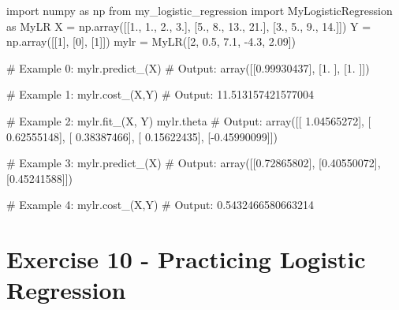 \documentclass[]{article}
\newenvironment{Shaded}{\begin{snugshade}}{\end{snugshade}}
\newcommand{\CommentTok}[1]{\textcolor[rgb]{0.48,0.49,0.49}{#1}}
\newcommand{\DecValTok}[1]{\textcolor[rgb]{0.96,0.45,0.00}{#1}}
\newcommand{\FloatTok}[1]{\textcolor[rgb]{0.96,0.45,0.00}{#1}}
\newcommand{\ImportTok}[1]{\textcolor[rgb]{0.15,0.68,0.38}{#1}}
\newcommand{\NormalTok}[1]{\textcolor[rgb]{0.81,0.81,0.76}{#1}}
\newcommand{\OperatorTok}[1]{\textcolor[rgb]{0.81,0.81,0.76}{#1}}
\begin{document}
\begin{Shaded}
\begin{Highlighting}[]
\ImportTok{import}\NormalTok{ numpy }\ImportTok{as}\NormalTok{ np}
\ImportTok{from}\NormalTok{ my_logistic_regression }\ImportTok{import}\NormalTok{ MyLogisticRegression }\ImportTok{as}\NormalTok{ MyLR}
\NormalTok{X }\OperatorTok{=}\NormalTok{ np.array([[}\FloatTok{1.}\NormalTok{, }\FloatTok{1.}\NormalTok{, }\FloatTok{2.}\NormalTok{, }\FloatTok{3.}\NormalTok{], [}\FloatTok{5.}\NormalTok{, }\FloatTok{8.}\NormalTok{, }\FloatTok{13.}\NormalTok{, }\FloatTok{21.}\NormalTok{], [}\FloatTok{3.}\NormalTok{, }\FloatTok{5.}\NormalTok{, }\FloatTok{9.}\NormalTok{, }\FloatTok{14.}\NormalTok{]])}
\NormalTok{Y }\OperatorTok{=}\NormalTok{ np.array([[}\DecValTok{1}\NormalTok{], [}\DecValTok{0}\NormalTok{], [}\DecValTok{1}\NormalTok{]])}
\NormalTok{mylr }\OperatorTok{=}\NormalTok{ MyLR([}\DecValTok{2}\NormalTok{, }\FloatTok{0.5}\NormalTok{, }\FloatTok{7.1}\NormalTok{, }\FloatTok{-4.3}\NormalTok{, }\FloatTok{2.09}\NormalTok{])}

\CommentTok{# Example 0:}
\NormalTok{mylr.predict_(X)}
\CommentTok{# Output:}
\NormalTok{array([[}\FloatTok{0.99930437}\NormalTok{],}
\NormalTok{       [}\FloatTok{1.}\NormalTok{        ],}
\NormalTok{       [}\FloatTok{1.}\NormalTok{        ]])}

\CommentTok{# Example 1:}
\NormalTok{mylr.cost_(X,Y)}
\CommentTok{# Output:}
\FloatTok{11.513157421577004}

\CommentTok{# Example 2:}
\NormalTok{mylr.fit_(X, Y)}
\NormalTok{mylr.theta}
\CommentTok{# Output:}
\NormalTok{array([[ }\FloatTok{1.04565272}\NormalTok{],}
\NormalTok{       [ }\FloatTok{0.62555148}\NormalTok{],}
\NormalTok{       [ }\FloatTok{0.38387466}\NormalTok{],}
\NormalTok{       [ }\FloatTok{0.15622435}\NormalTok{],}
\NormalTok{       [}\OperatorTok{-}\FloatTok{0.45990099}\NormalTok{]])}

\CommentTok{# Example 3:}
\NormalTok{mylr.predict_(X)}
\CommentTok{# Output:}
\NormalTok{array([[}\FloatTok{0.72865802}\NormalTok{],}
\NormalTok{       [}\FloatTok{0.40550072}\NormalTok{],}
\NormalTok{       [}\FloatTok{0.45241588}\NormalTok{]])}

\CommentTok{# Example 4:}
\NormalTok{mylr.cost_(X,Y)}
\CommentTok{# Output:}
\FloatTok{0.5432466580663214}
\end{Highlighting}
\end{Shaded}

\clearpage

\hypertarget{exercise-10---practicing-logistic-regression-1}{%
\section{Exercise 10 - Practicing Logistic
Regression}\label{exercise-10---practicing-logistic-regression-1}}
\end{document}
